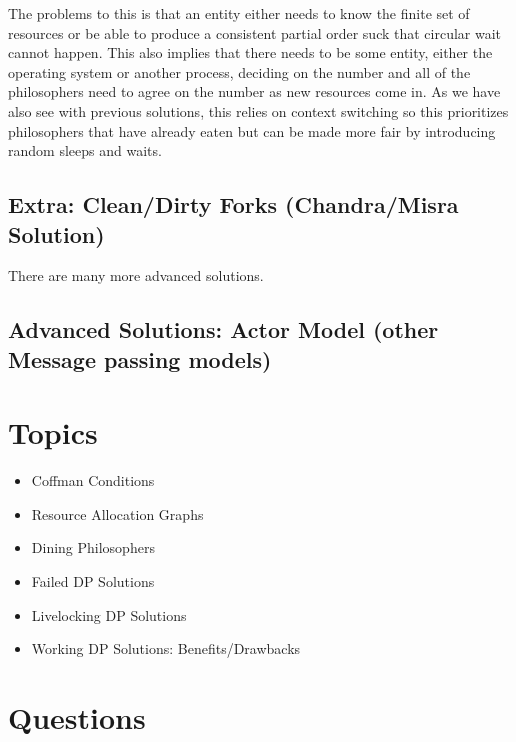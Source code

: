 The problems to this is that an entity either needs to know the finite set of resources or be able to produce a consistent partial order suck that circular wait cannot happen. This also implies that there needs to be some entity, either the operating system or another process, deciding on the number and all of the philosophers need to agree on the number as new resources come in. As we have also see with previous solutions, this relies on context switching so this prioritizes philosophers that have already eaten but can be made more fair by introducing random sleeps and waits.


\subsection{Extra: Clean/Dirty Forks (Chandra/Misra Solution)}

There are many more advanced solutions.


\subsection{Advanced Solutions: Actor Model (other Message passing models)}

\section{Topics}

\begin{itemize}
  \item Coffman Conditions
  \item Resource Allocation Graphs
  \item Dining Philosophers
  \item Failed DP Solutions 
  \item Livelocking DP Solutions 
  \item Working DP Solutions: Benefits/Drawbacks
\end{itemize}

\section{Questions}

